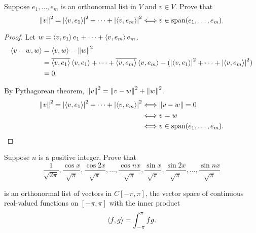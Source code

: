 \begin{exercise}
    Suppose $e_{1}, \ldots, e_{m}$ is an orthonormal list in $V$ and $v\in V$. Prove that
    \[
        \left\Vert{v}\right\Vert^{2} = \left\vert{\left\langle{v, e_{1}}\right\rangle}\right\vert^{2} + \cdots + \left\vert{\left\langle{v, e_{m}}\right\rangle}\right\vert^{2} \Longleftrightarrow v\in\operatorname{span}(e_{1}, \ldots, e_{m}).
    \]
\end{exercise}

\begin{proof}
    Let $w = \left\langle{v, e_{1}}\right\rangle e_{1} + \cdots + \left\langle{v, e_{m}}\right\rangle e_{m}$.
    \begin{align*}
        \left\langle{v - w, w}\right\rangle & = \left\langle{v, w}\right\rangle - \left\Vert{w}\right\Vert^{2}                                                                                                                                                          \\
                             & = \overline{\left\langle{v, e_{1}}\right\rangle}\left\langle{v, e_{1}}\right\rangle + \cdots + \overline{\left\langle{v, e_{m}}\right\rangle}\left\langle{v, e_{m}}\right\rangle - ( \left\vert{\left\langle{v, e_{1}}\right\rangle}\right\vert^{2} + \cdots + \left\vert{\left\langle{v, e_{m}}\right\rangle}\right\vert^{2}) \\
                             & = 0.
    \end{align*}

    By Pythagorean theorem, $\left\Vert{v}\right\Vert^{2} = \left\Vert{v - w}\right\Vert^{2} + \left\Vert{w}\right\Vert^{2}$.
    \begin{align*}
        \left\Vert{v}\right\Vert^{2} = \left\vert{\left\langle{v, e_{1}}\right\rangle}\right\vert^{2} + \cdots + \left\vert{\left\langle{v, e_{m}}\right\rangle}\right\vert^{2} & \Longleftrightarrow \left\Vert{v - w}\right\Vert = 0                               \\
                                                                                                & \Longleftrightarrow v = w                                          \\
                                                                                                & \Longleftrightarrow v\in\operatorname{span}(e_{1}, \ldots, e_{m}).
    \end{align*}
\end{proof}
\newpage

\begin{exercise}\label{chapter6:sectionB:exercise4}
    Suppose $n$ is a positive integer. Prove that
    \[
        \frac{1}{\sqrt{2\pi}}, \frac{\cos x}{\sqrt{\pi}}, \frac{\cos 2x}{\sqrt{\pi}}, \ldots, \frac{\cos nx}{\sqrt{\pi}}, \frac{\sin x}{\sqrt{\pi}}, \frac{\sin 2x}{\sqrt{\pi}}, \ldots, \frac{\sin nx}{\sqrt{\pi}}
    \]

    is an orthonormal list of vectors in $C[-\pi, \pi]$, the vector space of continuous real-valued functions on $[-\pi, \pi]$ with the inner product
    \[
        \left\langle{f, g}\right\rangle = \int^{\pi}_{-\pi} fg.
    \]
\end{exercise}

